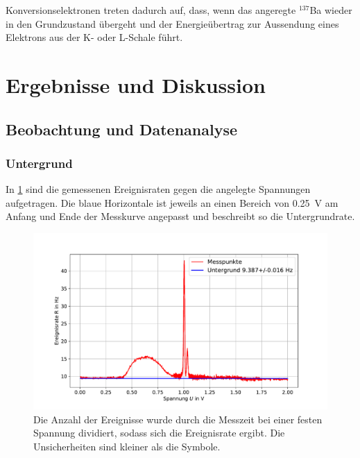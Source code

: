 \documentclass[
	a4paper,
	12pt,
	pagesize,
	ngerman
]{scrartcl}
\begin{document}
	Konversionselektronen treten dadurch auf, dass, wenn das angeregte $^{137}$Ba wieder in den Grundzustand übergeht und der Energieübertrag zur Aussendung eines Elektrons aus der K- oder L-Schale führt. %

	\section{Ergebnisse und Diskussion}


	\subsection{Beobachtung und Datenanalyse}
	\subsubsection{Untergrund}
	In \cref{fg_untergrund} sind die gemessenen Ereignisraten gegen die angelegte Spannungen aufgetragen.
	Die blaue Horizontale ist jeweils an einen Bereich von \SI{0.25}{V} am Anfang und Ende der Messkurve angepasst und beschreibt so die Untergrundrate.
	\begin{figure}[H]
			\includegraphics[width=  \linewidth]{img/untergrund}
			\caption{
			Die Anzahl der Ereignisse wurde durch die Messzeit bei einer festen Spannung dividiert, sodass sich die Ereignisrate ergibt.
			Die Unsicherheiten sind kleiner als die Symbole.
			}
			\label{fg_untergrund}
	\end{figure}
\end{document}
